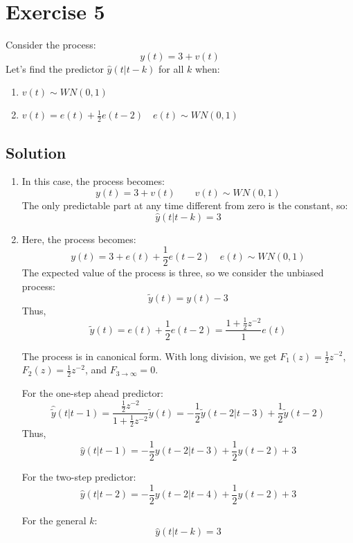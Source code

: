 \section{Exercise 5}

Consider the process: 
\[y(t)=3+v(t)\]
Let's find the predictor $\hat{y}(t|t-k)$ for all $k$ when: 
\begin{enumerate}
    \item $v(t)\sim WN(0,1)$
    \item $v(t)=e(t)+\frac{1}{2}e(t-2)\quad e(t)\sim WN(0,1)$
\end{enumerate}

\subsection*{Solution}
\begin{enumerate}
    \item In this case, the process becomes:
        \[y(t)=3+v(t) \qquad v(t)\sim WN(0,1)\]
        The only predictable part at any time different from zero is the constant, so:
        \[\hat{y}(t|t-k)=3\]
    \item Here, the process becomes:
        \[y(t)=3+e(t)+\frac{1}{2}e(t-2)\quad e(t)\sim WN(0,1)\]
        The expected value of the process is three, so we consider the unbiased process:
        \[\tilde{y}(t)=y(t)-3\]
        Thus,
        \[\tilde{y}(t)=e(t)+\frac{1}{2}e(t-2)=\dfrac{1+\frac{1}{2}z^{-2}}{1}e(t)\]

        The process is in canonical form. 
        With long division, we get $F_1(z)=\frac{1}{2}z^{-2}$, $F_2(z)=\frac{1}{2}z^{-2}$, and $F_{3\rightarrow\infty}=0$. 

        For the one-step ahead predictor: 
        \[\hat{\tilde{y}}(t|t-1)=\dfrac{\frac{1}{2}z^{-2}}{1+\frac{1}{2}z^{-2}}\tilde{y}(t)=-\dfrac{1}{2}\tilde{y}(t-2|t-3)+\dfrac{1}{2}\tilde{y}(t-2)\]
        Thus, 
        \[\hat{y}(t|t-1)=-\dfrac{1}{2}y(t-2|t-3)+\dfrac{1}{2}y(t-2)+3\]

        For the two-step predictor: 
        \[\hat{y}(t|t-2)=-\dfrac{1}{2}y(t-2|t-4)+\dfrac{1}{2}y(t-2)+3\]

        For the general $k$: 
        \[\hat{y}(t|t-k)=3\]
\end{enumerate}